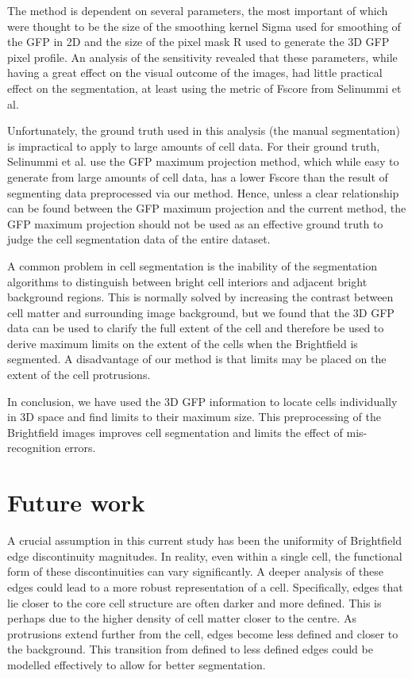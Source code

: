 The method is dependent on several parameters, the most important of which were thought to be the size of the smoothing kernel Sigma used for smoothing of the GFP in 2D and the size of the pixel mask R used to generate the 3D GFP pixel profile. An analysis of the sensitivity revealed that these parameters, while having a great effect on the visual outcome of the images, had little practical effect on the segmentation, at least using the metric of Fscore from Selinummi et al.

Unfortunately, the ground truth used in this analysis (the manual segmentation) is impractical to apply to large amounts of cell data. For their ground truth, Selinummi et al. use the GFP maximum projection method, which while easy to generate from large amounts of cell data, has a lower Fscore than the result of segmenting data preprocessed via our method. Hence, unless a clear relationship can be found between the GFP maximum projection and the current method, the GFP maximum projection should not be used as an effective ground truth to judge the cell segmentation data of the entire dataset.

A common problem in cell segmentation is the inability of the segmentation algorithms to distinguish between bright cell interiors and adjacent bright background regions. This is normally solved by increasing the contrast between cell matter and surrounding image background, but we found that the 3D GFP data can be used to clarify the full extent of the cell and therefore be used to derive maximum limits on the extent of the cells when the Brightfield is segmented. A disadvantage of our method is that limits may be placed on the extent of the cell protrusions.

In conclusion, we have used the 3D GFP information to locate cells individually in 3D space and find limits to their maximum size. This preprocessing of the Brightfield images improves cell segmentation and limits the effect of mis-recognition errors.

\section{Future work}

A crucial assumption in this current study has been the uniformity of Brightfield edge discontinuity magnitudes. In reality, even within a single cell, the functional form of these discontinuities can vary significantly. A deeper analysis of these edges could lead to a more robust representation of a cell. Specifically, edges that lie closer to the core cell structure are often darker and more defined. This is perhaps due to the higher density of cell matter closer to the centre. As protrusions extend further from the cell, edges become less defined and closer to the background. This transition from defined to less defined edges could be modelled effectively to allow for better segmentation.

